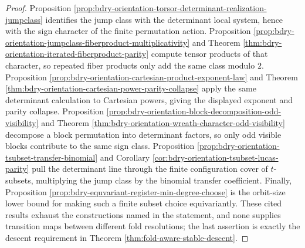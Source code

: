 \begin{proof}
Proposition \ref{prop:bdry-orientation-torsor-determinant-realization-jumpclass} identifies the jump class with the determinant local system, hence with the sign character of the finite permutation action.  Proposition \ref{prop:bdry-orientation-jumpclass-fiberproduct-multiplicativity} and Theorem \ref{thm:bdry-orientation-iterated-fiberproduct-parity} compute tensor products of that character, so repeated fiber products only add the same class modulo \(2\).  Proposition \ref{prop:bdry-orientation-cartesian-product-exponent-law} and Theorem \ref{thm:bdry-orientation-cartesian-power-parity-collapse} apply the same determinant calculation to Cartesian powers, giving the displayed exponent and parity collapse.  Proposition \ref{prop:bdry-orientation-block-decomposition-odd-visibility} and Theorem \ref{thm:bdry-orientation-wreath-character-odd-visibility} decompose a block permutation into determinant factors, so only odd visible blocks contribute to the same sign class.  Proposition \ref{prop:bdry-orientation-tsubset-transfer-binomial} and Corollary \ref{cor:bdry-orientation-tsubset-lucas-parity} pull the determinant line through the finite configuration cover of \(t\)-subsets, multiplying the jump class by the binomial transfer coefficient.  Finally, Proposition \ref{prop:bdry-equvariant-register-min-degree-choose} is the orbit-size lower bound for making such a finite subset choice equivariantly.  These cited results exhaust the constructions named in the statement, and none supplies transition maps between different fold resolutions; the last assertion is exactly the descent requirement in Theorem \ref{thm:fold-aware-stable-descent}. \qedhere
\end{proof}

\endinput

